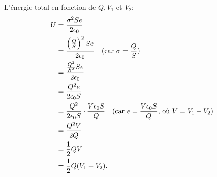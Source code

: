 \documentclass[12pt]{article}
\begin{document}
\begin{correctionbox}
	\noindent L'énergie total en fonction de $Q,V_1$ et $V_2$:
	\begin{align*}
		U & = \frac{\sigma^2 S e}{2\epsilon_0}                                                                                                   \\
		  & = \frac{\left( \frac{Q}{S} \right)^2 S e}{2\epsilon_0} \quad \text{(car $ \sigma = \frac{Q}{S} $)}                                   \\
		  & = \frac{\frac{Q^2}{S^2} S e}{2\epsilon_0}                                                                                            \\
		  & = \frac{Q^2 e}{2\epsilon_0 S}                                                                                                        \\
		  & = \frac{Q^2}{2\epsilon_0 S} \cdot \frac{V \epsilon_0 S}{Q} \quad \text{(car $ e = \frac{V \epsilon_0 S}{Q} $, où $ V = V_1 - V_2 $)} \\
		  & = \frac{Q^2 V}{2 Q}                                                                                                                  \\
		  & = \frac{1}{2} Q V                                                                                                                    \\
		  & = \frac{1}{2} Q (V_1 - V_2).
	\end{align*}
\end{correctionbox}
\end{document}
